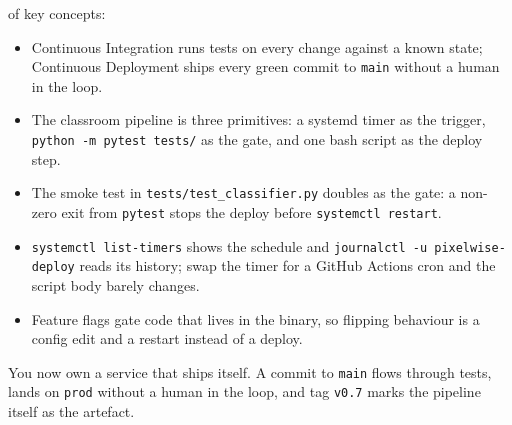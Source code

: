  of key concepts:
\begin{itemize}
    \item Continuous Integration runs tests on every change against a known state; Continuous Deployment ships every green commit to \texttt{main} without a human in the loop.
    \item The classroom pipeline is three primitives: a systemd timer as the trigger, \texttt{python -m pytest tests/} as the gate, and one bash script as the deploy step.
    \item The smoke test in \texttt{tests/test\_classifier.py} doubles as the gate: a non-zero exit from \texttt{pytest} stops the deploy before \texttt{systemctl restart}.
    \item \texttt{systemctl list-timers} shows the schedule and \texttt{journalctl -u pixelwise-deploy} reads its history; swap the timer for a GitHub Actions cron and the script body barely changes.
    \item Feature flags gate code that lives in the binary, so flipping behaviour is a config edit and a restart instead of a deploy.
\end{itemize}


You now own a service that ships itself.
A commit to \texttt{main} flows through tests, lands on \texttt{prod}
without a human in the loop, and tag \texttt{v0.7} marks the
pipeline itself as the artefact.
